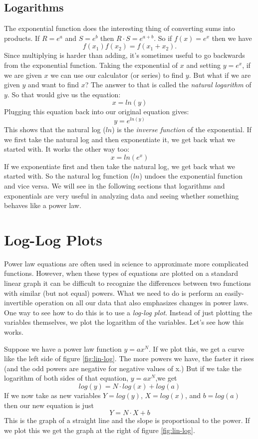 \subsection*{Logarithms}
The exponential function does the interesting thing of converting sums into products.
If $R = e^{a}$ and $S = e^{b}$ then $R \cdot S = e^{a+b}$.
So if $f(x) = e^{x}$ then we have
\[ f(x_{1})f(x_{2}) = f(x_{1} + x_{2}). \]
Since multiplying is harder than adding, it's sometimes useful to go backwards from the exponential function. 
Taking the exponential of $x$ and setting $y = e^{x}$, if we are given $x$ we can use our calculator (or series) to find $y$.
But what if we are given $y$ and want to find $x$?
The answer to that is called the \emph{natural logarithm} of $y$.
So that would give us the equation:
\[ x = ln(y) \]
Plugging this equation back into our original equation gives:
\[ y = e^{ln(y)} \]
This shows that the natural log ($ln$) is the \emph{inverse function} of the exponential.
If we first take the natural log and then exponentiate it, we get back what we started with.
It works the other way too:
\[ x = ln(e^{x}) \]
If we exponentiate first and then take the natural log, we get back what we started with.
So the natural log function ($ln$) undoes the exponential function and vice versa.
We will see in the following sections that logarithms and exponentials are very useful in analyzing data and seeing whether something behaves like a power law. 

\section{Log-Log Plots}
Power law equations are often used in science to approximate more complicated functions.
However, when these types of equations are plotted on a standard linear graph it can be difficult to recognize the differences between two functions with similar (but not equal) powers.
What we need to do is perform an easily-invertible operation on all our data that also emphasizes changes in power laws. 
One way to see how to do this is to use a \emph{log-log plot}.
Instead of just plotting the variables themselves, we plot the logarithm of the variables.
Let's see how this works.
\par
Suppose we have a power law function $y = ax^{N}$.
If we plot this, we get a curve like the left side of figure \ref{fig:lin-log}.
The more powers we have, the faster it rises (and the odd powers are negative for negative values of x.)
But if we take the logarithm of both sides of that equation, $y = ax^{N}$,we get
\[ log(y)=N \cdot log(x) + log(a) \] 
If we now take as new variables $Y = log(y)$, $X = log(x)$, and $b = log(a)$ then our new equation is just
\[ Y = N \cdot X + b \]
This is the graph of a straight line and the slope is proportional to the power.
If we plot this we get the graph at the right of figure \ref{fig:lin-log}.

